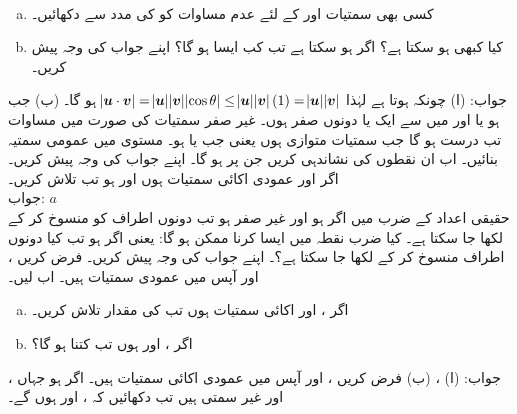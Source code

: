 \\
\begin{enumerate}[a.]
\item
کسی بھی سمتیات  اور  کے لئے عدم مساوات  کو  کی مدد سے دکھائیں۔
\item
کیا کبھی  ہو سکتا ہے؟ اگر ہو سکتا ہے تب کب ایسا ہو گا؟  اپنے جواب کی وجہ پیش کریں۔
\end{enumerate}
جواب:\quad
(ا) چونکہ   ہوتا ہے لہٰذا 
$\abs{{{\boldsymbol{u}}}\cdot{\ensuremath{{\boldsymbol{v}}}}}=\abs{{{\boldsymbol{u}}}}\abs{{{\boldsymbol{v}}}}\abs{\cos\theta}\le\abs{{{\boldsymbol{u}}}}\abs{{{\boldsymbol{v}}}}(1)=\abs{{{\boldsymbol{u}}}}\abs{{{\boldsymbol{v}}}}$
ہو گا۔ (ب) جب  ہو یا  اور  میں سے ایک یا دونوں صفر ہوں۔ غیر صفر سمتیات کی صورت میں مساوات تب درست ہو گا جب سمتیات متوازی ہوں یعنی جب  یا  ہو۔
مستوی  میں عمومی سمتیہ  بنائیں۔ اب ان نقطوں  کی نشاندہی کریں جن پر  ہو گا۔ اپنے جواب کی وجہ پیش کریں۔
اگر  اور  عمودی اکائی سمتیات ہوں اور  ہو تب  تلاش کریں۔\\
جواب:\quad
$a $
\\
حقیقی اعداد کے ضرب میں اگر  ہو اور  غیر صفر ہو تب دونوں اطراف  کو منسوخ کر کے  لکھا جا سکتا ہے۔ کیا ضرب نقطہ میں ایسا کرنا ممکن ہو گا: یعنی اگر  ہو تب کیا دونوں اطراف  منسوخ کر کے  لکھا جا سکتا ہے؟۔ اپنے جواب کی وجہ پیش کریں۔
فرض کریں ،  اور  آپس میں عمودی سمتیات ہیں۔ اب  لیں۔
\begin{enumerate}[a.]
\item
اگر ،  اور  اکائی سمتیات ہوں تب  کی مقدار  تلاش کریں۔
\item
اگر ،  اور  ہوں تب  کتنا ہو گا؟
\end{enumerate}
جواب:\quad
(ا) ، (ب) 
فرض کریں ،  اور  آپس میں عمودی اکائی سمتیات ہیں۔ اگر  ہو جہاں ،  اور  غیر سمتی ہیں تب دکھائیں کہ ،  اور  ہوں گے۔ 

